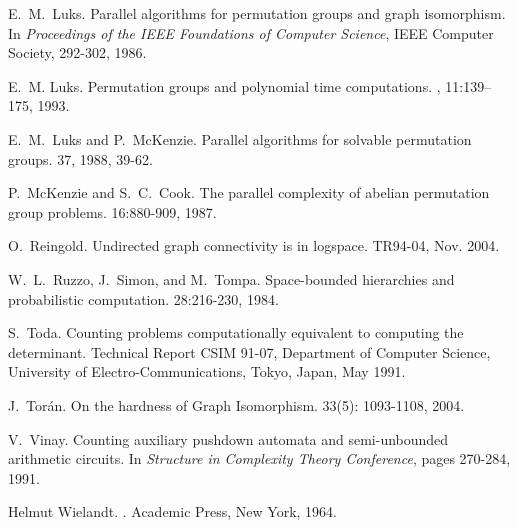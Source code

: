 \documentclass[11pt]{article}
\begin{document}
\begin{thebibliography}{MVV87}

 E.~M.~Luks.  
\newblock Parallel algorithms
for permutation groups and graph isomorphism.  
\newblock In {\em Proceedings of the IEEE Foundations of Computer Science},
IEEE Computer Society, 292-302, 1986.

E.~M. Luks.
\newblock Permutation groups and polynomial time computations.
, 11:139--175, 1993.

E.~M.~Luks and P.~McKenzie.
\newblock Parallel algorithms for solvable permutation groups.
 37, 1988, 39-62.

P.~McKenzie and S.~C.~Cook.
\newblock The parallel complexity of abelian permutation group problems.
 16:880-909, 1987.

O.~Reingold.
\newblock Undirected graph connectivity is in logspace.
 TR94-04, Nov. 2004.

W.~L.~Ruzzo, J.~Simon, and M.~Tompa.  
\newblock Space-bounded hierarchies and probabilistic computation.  
 28:216-230, 1984.

S.~Toda.
\newblock Counting problems computationally equivalent to computing the
  determinant.
\newblock Technical Report CSIM 91-07, Department of Computer Science,
  University of Electro-Communications, Tokyo, Japan, May 1991.

J.~Tor\'an.
\newblock On the hardness of Graph Isomorphism.
 33(5): 1093-1108, 2004.

V.~Vinay.
\newblock Counting auxiliary pushdown automata and semi-unbounded arithmetic
  circuits.
\newblock In {\em Structure in Complexity Theory Conference}, pages 270-284,
  1991.

Helmut Wielandt.
.
\newblock Academic Press, New York, 1964.

\end{thebibliography}
\end{document}
